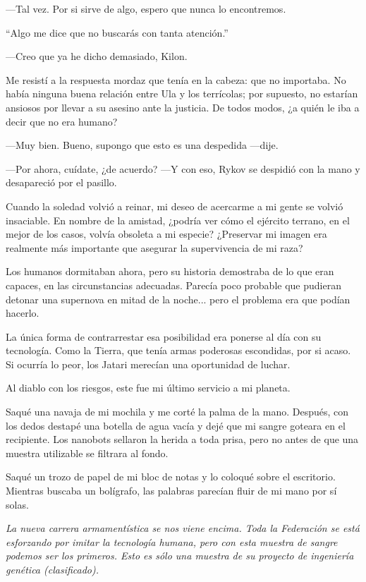 —Tal vez. Por si sirve de algo, espero que nunca lo encontremos.

``Algo me dice que no buscarás con tanta atención.''


—Creo que ya he dicho demasiado, Kilon.

Me resistí a la respuesta mordaz que tenía en la cabeza: que no importaba. No había ninguna buena relación entre Ula y los terrícolas; por supuesto, no estarían ansiosos por llevar a su asesino ante la justicia. De todos modos, ¿a quién le iba a decir que no era humano?

—Muy bien. Bueno, supongo que esto es una despedida —dije.

—Por ahora, cuídate, ¿de acuerdo? —Y con eso, Rykov se despidió con la mano y desapareció por el pasillo.

Cuando la soledad volvió a reinar, mi deseo de acercarme a mi gente se volvió insaciable. En nombre de la amistad, ¿podría ver cómo el ejército terrano, en el mejor de los casos, volvía obsoleta a mi especie? ¿Preservar mi imagen era realmente más importante que asegurar la supervivencia de mi raza?

Los humanos dormitaban ahora, pero su historia demostraba de lo que eran capaces, en las circunstancias adecuadas. Parecía poco probable que pudieran detonar una supernova en mitad de la noche... pero el problema era que podían hacerlo.

La única forma de contrarrestar esa posibilidad era ponerse al día con su tecnología. Como la Tierra, que tenía armas poderosas escondidas, por si acaso. Si ocurría lo peor, los Jatari merecían una oportunidad de luchar.

Al diablo con los riesgos, este fue mi último servicio a mi planeta.

Saqué una navaja de mi mochila y me corté la palma de la mano. Después, con los dedos destapé una botella de agua vacía y dejé que mi sangre goteara en el recipiente. Los nanobots sellaron la herida a toda prisa, pero no antes de que una muestra utilizable se filtrara al fondo.

Saqué un trozo de papel de mi bloc de notas y lo coloqué sobre el escritorio. Mientras buscaba un bolígrafo, las palabras parecían fluir de mi mano por sí solas.

\textit{La nueva carrera armamentística se nos viene encima. Toda la Federación se está esforzando por imitar la tecnología humana, pero con esta muestra de sangre podemos ser los primeros. Esto es sólo una muestra de su proyecto de ingeniería genética (clasificado).}

